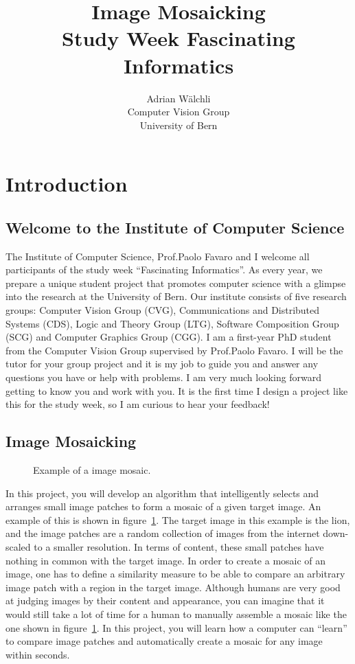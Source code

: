 \documentclass[]{article}
\title{Image Mosaicking \\ Study Week Fascinating Informatics}
\author{Adrian W\"alchli \\ Computer Vision Group \\ University of Bern}
\begin{document}
\maketitle
\tableofcontents


\section{Introduction}
	\subsection{Welcome to the Institute of Computer Science}
		The Institute of Computer Science, Prof.\@ Paolo Favaro and I welcome all participants of the study week ``Fascinating Informatics''.
		As every year, we prepare a unique student project that promotes computer science with a glimpse into the research at the University of Bern.
		Our institute consists of five research groups: Computer Vision Group (CVG), Communications and Distributed Systems (CDS), Logic and Theory Group (LTG), Software Composition Group (SCG) and Computer Graphics Group (CGG).
		I am a first-year PhD student from the Computer Vision Group supervised by Prof.\@ Paolo Favaro. 
		I will be the tutor for your group project and it is my job to guide you and answer any questions you have or help with problems.
		I am very much looking forward getting to know you and work with you.
		It is the first time I design a project like this for the study week, so I am curious to hear your feedback!
		
	
	\subsection{Image Mosaicking}
		\begin{figure}
			\caption{Example of a image mosaic.}
			\label{fig:mosaicking-example}
		\end{figure}
		In this project, you will develop an algorithm that intelligently selects and arranges small image patches to form a mosaic of a given target image.
		An example of this is shown in figure~\ref{fig:mosaicking-example}. 
		The target image in this example is the lion, and the image patches are a random collection of images from the internet down-scaled to a smaller resolution.
		In terms of content, these small patches have nothing in common with the target image.
		In order to create a mosaic of an image, one has to define a similarity measure to be able to compare an arbitrary image patch with a region in the target image. 
		Although humans are very good at judging images by their content and appearance, you can imagine that it would still take a lot of time for a human to manually assemble a mosaic like the one shown in figure~\ref{fig:mosaicking-example}.
		In this project, you will learn how a computer can ``learn'' to compare image patches and automatically create a mosaic for any image within seconds.
	
\end{document}
